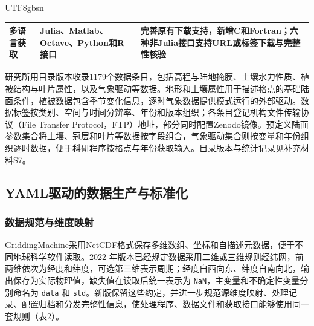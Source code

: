 \documentclass[numdoi]{chinese}
\newlength{\gmTableWidth}
\begin{document}
\begin{CJK}{UTF8}{gbsn}
\begin{table}[!htbp]
\begin{tabular}{@{}>{\raggedright\arraybackslash}p{0.17\gmTableWidth}>{\raggedright\arraybackslash}p{0.36\gmTableWidth}>{\raggedright\arraybackslash}p{0.47\gmTableWidth}@{}}
多语言获取 & Julia、Matlab、Octave、Python和R接口 & 完善原有下载支持，新增C和Fortran；六种非Julia接口支持URL或标签下载与完整性核验 \\
\bottomrule
\end{tabular}
\endgroup
\label{tab:1}
\end{table}
研究所用目录版本收录1179个数据条目，包括高程与陆地掩膜、土壤水力性质、植被结构与叶片属性，以及气象驱动等数据。地形和土壤属性用于描述格点的基础陆面条件，植被数据包含季节变化信息，逐时气象数据提供模式运行的外部驱动。数据标签按类别、空间与时间分辨率、年份和版本组织；各条目登记机构文件传输协议（File Transfer Protocol，FTP）地址，部分同时配置Zenodo镜像。预定义陆面参数集合将土壤、冠层和叶片等数据按字段组合，气象驱动集合则按变量和年份组织逐时数据，便于科研程序按格点与年份获取输入。目录版本与统计记录见补充材料S7。

\subsection{YAML驱动的数据生产与标准化}
\subsubsection{数据规范与维度映射}
GriddingMachine采用NetCDF格式保存多维数组、坐标和自描述元数据，便于不同地球科学软件读取\cite{ref2}。2022 年版本已经规定数据采用二维或三维规则经纬网，前两维依次为经度和纬度，可选第三维表示周期；经度自西向东、纬度自南向北，输出保存为实际物理值，缺失值在读取后统一表示为 \nolinkurl{NaN}，主变量和不确定性变量分别命名为 \nolinkurl{data} 和 \nolinkurl{std}\cite{ref5}。新版保留这些约定，并进一步规范源维度映射、处理记录、配置归档和分发完整性信息，使处理程序、数据文件和获取接口能够使用同一套规则（表2）。


\end{CJK}
\end{document}
